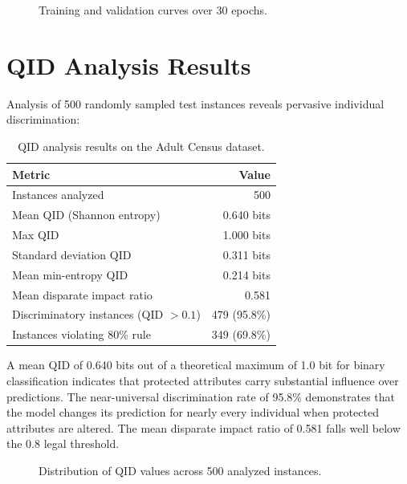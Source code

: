 \begin{figure}[H]
    \centering
    \caption{Training and validation curves over 30 epochs.}
    \label{fig:training}
\end{figure}

\section{QID Analysis Results}

Analysis of 500 randomly sampled test instances reveals pervasive individual discrimination:

\begin{table}[H]
\centering
\caption{QID analysis results on the Adult Census dataset.}
\label{tab:qid}
\begin{tabular}{@{}lr@{}}
\toprule
\textbf{Metric} & \textbf{Value} \\
\midrule
Instances analyzed & 500 \\
Mean QID (Shannon entropy) & 0.640 bits \\
Max QID & 1.000 bits \\
Standard deviation QID & 0.311 bits \\
Mean min-entropy QID & 0.214 bits \\
Mean disparate impact ratio & 0.581 \\
Discriminatory instances (QID $> 0.1$) & 479 (95.8\%) \\
Instances violating 80\% rule & 349 (69.8\%) \\
\bottomrule
\end{tabular}
\end{table}

A mean QID of 0.640 bits out of a theoretical maximum of 1.0 bit for binary classification indicates that protected attributes carry substantial influence over predictions. The near-universal discrimination rate of 95.8\% demonstrates that the model changes its prediction for nearly every individual when protected attributes are altered. The mean disparate impact ratio of 0.581 falls well below the 0.8 legal threshold.

\begin{figure}[H]
    \centering
    \caption{Distribution of QID values across 500 analyzed instances.}
    \label{fig:qid_dist}
\end{figure}

